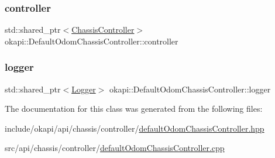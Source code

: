 \subsubsection{\texorpdfstring{controller}{controller}}
{\footnotesize\ttfamily std\+::shared\+\_\+ptr$<$\mbox{\hyperlink{classokapi_1_1ChassisController}{Chassis\+Controller}}$>$ okapi\+::\+Default\+Odom\+Chassis\+Controller\+::controller\hspace{0.3cm}{\ttfamily [protected]}}

\mbox{\label{classokapi_1_1DefaultOdomChassisController_a1e34483ae1bcef368d80b69f54a3b091}} 
\subsubsection{\texorpdfstring{logger}{logger}}
{\footnotesize\ttfamily std\+::shared\+\_\+ptr$<$\mbox{\hyperlink{classokapi_1_1Logger}{Logger}}$>$ okapi\+::\+Default\+Odom\+Chassis\+Controller\+::logger\hspace{0.3cm}{\ttfamily [protected]}}



The documentation for this class was generated from the following files\+:\begin{DoxyCompactItemize}
\item 
include/okapi/api/chassis/controller/\mbox{\hyperlink{defaultOdomChassisController_8hpp}{default\+Odom\+Chassis\+Controller.\+hpp}}\item 
src/api/chassis/controller/\mbox{\hyperlink{defaultOdomChassisController_8cpp}{default\+Odom\+Chassis\+Controller.\+cpp}}\end{DoxyCompactItemize}
